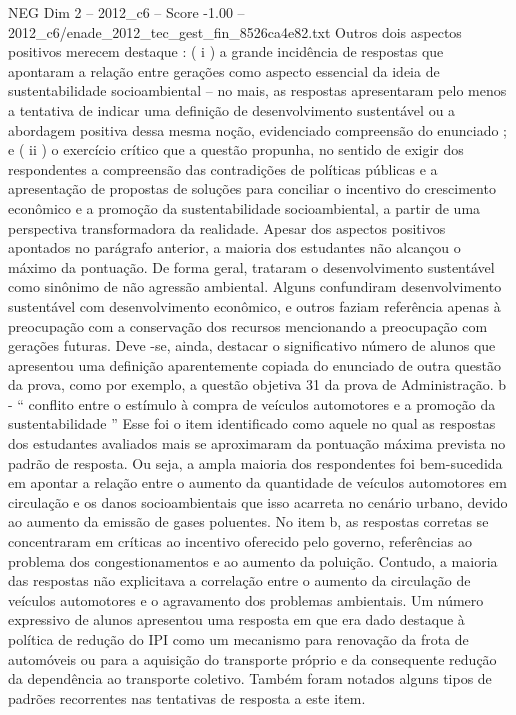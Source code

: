 \begin{textsample}{NEG Dim 2 – 2012\_c6 – Score -1.00 – 2012\_c6/enade\_2012\_tec\_gest\_fin\_8526ca4e82.txt}
Outros dois aspectos positivos merecem destaque : ( i ) a grande incidência de respostas que apontaram a relação entre gerações como aspecto essencial da ideia de sustentabilidade socioambiental – no mais, as respostas apresentaram pelo menos a tentativa de indicar uma definição de desenvolvimento sustentável ou a abordagem positiva dessa mesma noção, evidenciado compreensão do enunciado ; e ( ii ) o exercício crítico que a questão propunha, no sentido de exigir dos respondentes a compreensão das contradições de políticas públicas e a apresentação de propostas de soluções para conciliar o incentivo do crescimento econômico e a promoção da sustentabilidade socioambiental, a partir de uma perspectiva transformadora da realidade.
Apesar dos aspectos positivos apontados no parágrafo anterior, a maioria dos estudantes não alcançou o máximo da pontuação.
De forma geral, trataram o desenvolvimento sustentável como sinônimo de não agressão ambiental.
Alguns confundiram desenvolvimento sustentável com desenvolvimento econômico, e outros faziam referência apenas à preocupação com a conservação dos recursos mencionando a preocupação com gerações futuras.
Deve -se, ainda, destacar o significativo número de alunos que apresentou uma definição aparentemente copiada do enunciado de outra questão da prova, como por exemplo, a questão objetiva 31 da prova de Administração. b - “ conflito entre o estímulo à compra de veículos automotores e a promoção da sustentabilidade ” Esse foi o item identificado como aquele no qual as respostas dos estudantes avaliados mais se aproximaram da pontuação máxima prevista no padrão de resposta.
Ou seja, a ampla maioria dos respondentes foi bem-sucedida em apontar a relação entre o aumento da quantidade de veículos automotores em circulação e os danos socioambientais que isso acarreta no cenário urbano, devido ao aumento da emissão de gases poluentes.
No item b, as respostas corretas se concentraram em críticas ao incentivo oferecido pelo governo, referências ao problema dos congestionamentos e ao aumento da poluição.
Contudo, a maioria das respostas não explicitava a correlação entre o aumento da circulação de veículos automotores e o agravamento dos problemas ambientais.
Um número expressivo de alunos apresentou uma resposta em que era dado destaque à política de redução do IPI como um mecanismo para renovação da frota de automóveis ou para a aquisição do transporte próprio e da consequente redução da dependência ao transporte coletivo.
Também foram notados alguns tipos de padrões recorrentes nas tentativas de resposta a este item.

\end{textsample}
